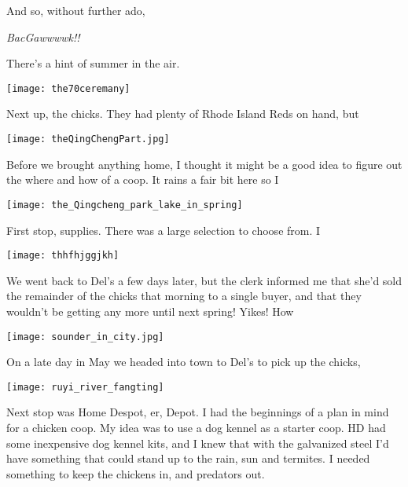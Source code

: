 And so, without further ado, 

{\Large {\em BacGawwwwk!!}}
\newpage

\vspace*{3in}
\begin{center}
\Huge{There's a hint of summer in the air.}
\end{center}
\newpage

\pagestyle{plain}

\vspace*{\fill}
\texttt{[image: the70ceremany]}

Next up, the chicks.  They had plenty of Rhode Island Reds on hand, but
\vspace*{\fill}
\newpage

\vspace*{\fill}
\texttt{[image: theQingChengPart.jpg]}

Before we brought anything home, I thought it might be a good idea to
figure out the where and how of a coop. It rains a fair bit here so I
\vspace*{\fill}
\newpage

\vspace*{\fill}
\texttt{[image: the\_Qingcheng\_park\_lake\_in\_spring]}

First stop, supplies.  There was a large selection to choose from.  I
\vspace*{\fill}
\newpage

\vspace*{\fill}
\texttt{[image: thhfhjggjkh]}

We went back to Del's a few days later, but the clerk informed me that
she'd sold the remainder of the chicks that morning to a single buyer,
and that they wouldn't be getting any more until next spring! Yikes! How
\vspace*{\fill}
\newpage

\vspace*{\fill}
\texttt{[image: sounder\_in\_city.jpg]}

On a late day in May we headed into town to Del's to pick up the chicks,
\vspace*{\fill}
\newpage

    \vspace*{\fill}
        \texttt{[image: ruyi\_river\_fangting]}

        Next stop was Home Despot, er, Depot.  I had the beginnings of a plan in
        mind for a chicken coop.  My idea was to use a dog kennel as a starter
        coop.  HD had some inexpensive dog kennel kits, and I knew that with the
        galvanized steel I'd have something that could stand up to the rain, sun
        and termites.  I needed something to keep the chickens in, and predators
        out. 
    \vspace*{\fill}
\newpage

